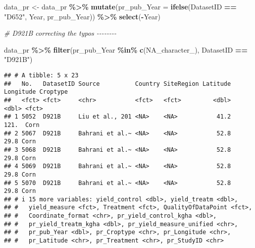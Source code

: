 \documentclass[
]{article}
\newenvironment{Shaded}{\begin{snugshade}}{\end{snugshade}}
\newcommand{\AttributeTok}[1]{\textcolor[rgb]{0.13,0.29,0.53}{#1}}
\newcommand{\CommentTok}[1]{\textcolor[rgb]{0.56,0.35,0.01}{\textit{#1}}}
\newcommand{\ConstantTok}[1]{\textcolor[rgb]{0.56,0.35,0.01}{#1}}
\newcommand{\FunctionTok}[1]{\textcolor[rgb]{0.13,0.29,0.53}{\textbf{#1}}}
\newcommand{\NormalTok}[1]{#1}
\newcommand{\OtherTok}[1]{\textcolor[rgb]{0.56,0.35,0.01}{#1}}
\newcommand{\SpecialCharTok}[1]{\textcolor[rgb]{0.81,0.36,0.00}{\textbf{#1}}}
\newcommand{\StringTok}[1]{\textcolor[rgb]{0.31,0.60,0.02}{#1}}
\begin{document}
\begin{Shaded}
\begin{Highlighting}[]
\NormalTok{data\_pr }\OtherTok{\textless{}{-}} 
\NormalTok{  data\_pr }\SpecialCharTok{\%\textgreater{}\%} 
  \FunctionTok{mutate}\NormalTok{(}\AttributeTok{pr\_pub\_Year =} \FunctionTok{ifelse}\NormalTok{(DatasetID }\SpecialCharTok{==} \StringTok{"D652"}\NormalTok{, Year, pr\_pub\_Year)) }\SpecialCharTok{\%\textgreater{}\%} 
  \FunctionTok{select}\NormalTok{(}\SpecialCharTok{{-}}\NormalTok{Year)}
\end{Highlighting}
\end{Shaded}

\begin{Shaded}
\begin{Highlighting}[]
\CommentTok{\# D921B correcting the typos {-}{-}{-}{-}{-}{-}{-}{-}}

\NormalTok{data\_pr }\SpecialCharTok{\%\textgreater{}\%} 
  \FunctionTok{filter}\NormalTok{(pr\_pub\_Year }\SpecialCharTok{\%in\%} \FunctionTok{c}\NormalTok{(}\ConstantTok{NA\_character\_}\NormalTok{),}
\NormalTok{         DatasetID }\SpecialCharTok{==} \StringTok{"D921B"}\NormalTok{) }
\end{Highlighting}
\end{Shaded}

\begin{verbatim}
## # A tibble: 5 x 23
##   No.   DatasetID Source          Country SiteRegion Latitude Longitude Croptype
##   <fct> <fct>     <chr>           <fct>   <fct>         <dbl>     <dbl> <fct>   
## 1 5052  D921B     Liu et al., 201 <NA>    <NA>           41.2     121.  Corn    
## 2 5067  D921B     Bahrani et al.~ <NA>    <NA>           52.8      29.8 Corn    
## 3 5068  D921B     Bahrani et al.~ <NA>    <NA>           52.8      29.8 Corn    
## 4 5069  D921B     Bahrani et al.~ <NA>    <NA>           52.8      29.8 Corn    
## 5 5070  D921B     Bahrani et al.~ <NA>    <NA>           52.8      29.8 Corn    
## # i 15 more variables: yield_control <dbl>, yield_treatm <dbl>,
## #   yield_measure <fct>, Treatment <fct>, QualityOfDataPoint <fct>,
## #   Coordinate_format <chr>, pr_yield_control_kgha <dbl>,
## #   pr_yield_treatm_kgha <dbl>, pr_yield_measure_unified <chr>,
## #   pr_pub_Year <dbl>, pr_Croptype <chr>, pr_Longitude <chr>,
## #   pr_Latitude <chr>, pr_Treatment <chr>, pr_StudyID <chr>
\end{verbatim}
\end{document}
